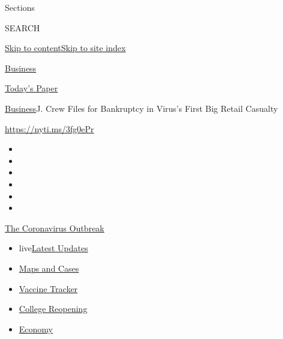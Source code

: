 Sections

SEARCH

\protect\hyperlink{site-content}{Skip to
content}\protect\hyperlink{site-index}{Skip to site index}

\href{https://www.nytimes3xbfgragh.onion/section/business}{Business}

\href{https://myaccount.nytimes3xbfgragh.onion/auth/login?response_type=cookie\&client_id=vi}{}

\href{https://www.nytimes3xbfgragh.onion/section/todayspaper}{Today's
Paper}

\href{/section/business}{Business}\textbar{}J. Crew Files for Bankruptcy
in Virus's First Big Retail Casualty

\href{https://nyti.ms/3fg0ePr}{https://nyti.ms/3fg0ePr}

\begin{itemize}
\item
\item
\item
\item
\item
\item
\end{itemize}

\href{https://www.nytimes3xbfgragh.onion/news-event/coronavirus?action=click\&pgtype=Article\&state=default\&region=TOP_BANNER\&context=storylines_menu}{The
Coronavirus Outbreak}

\begin{itemize}
\tightlist
\item
  live\href{https://www.nytimes3xbfgragh.onion/2020/08/03/world/coronavirus-covid-19.html?action=click\&pgtype=Article\&state=default\&region=TOP_BANNER\&context=storylines_menu}{Latest
  Updates}
\item
  \href{https://www.nytimes3xbfgragh.onion/interactive/2020/us/coronavirus-us-cases.html?action=click\&pgtype=Article\&state=default\&region=TOP_BANNER\&context=storylines_menu}{Maps
  and Cases}
\item
  \href{https://www.nytimes3xbfgragh.onion/interactive/2020/science/coronavirus-vaccine-tracker.html?action=click\&pgtype=Article\&state=default\&region=TOP_BANNER\&context=storylines_menu}{Vaccine
  Tracker}
\item
  \href{https://www.nytimes3xbfgragh.onion/2020/08/02/us/covid-college-reopening.html?action=click\&pgtype=Article\&state=default\&region=TOP_BANNER\&context=storylines_menu}{College
  Reopening}
\item
  \href{https://www.nytimes3xbfgragh.onion/live/2020/08/03/business/stock-market-today-coronavirus?action=click\&pgtype=Article\&state=default\&region=TOP_BANNER\&context=storylines_menu}{Economy}
\end{itemize}

